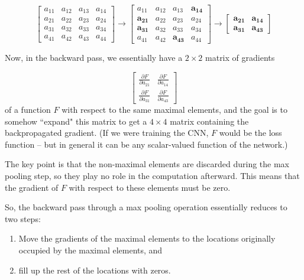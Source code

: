 \documentclass{article}[a4paper]
\begin{document}
\begin{equation*}
	\begin{bmatrix}
		a_{11} & a_{12} & a_{13} & a_{14} \\
		a_{21} & a_{22} & a_{23} & a_{24} \\
		a_{31} & a_{32} & a_{33} & a_{34} \\
		a_{41} & a_{42} & a_{43} & a_{44}
	\end{bmatrix} \rightarrow
	\begin{bmatrix}
		a_{11} & a_{12} & a_{13} & \mathbf{a_{14}} \\
		\mathbf{a_{21}} & a_{22} & a_{23} & a_{24} \\
		\mathbf{a_{31}} & a_{32} & a_{33} & a_{34} \\
		a_{41} & a_{42} & \mathbf{a_{43}} & a_{44}
	\end{bmatrix} \rightarrow
	\begin{bmatrix}
		\mathbf{a_{21}} & \mathbf{a_{14}} \\
		\mathbf{a_{31}} & \mathbf{a_{43}}
	\end{bmatrix}
\end{equation*}

Now, in the backward pass, we essentially have a $2 \times 2$ matrix of gradients

\begin{equation*}
	\renewcommand{\arraystretch}{1.5}
	\begin{bmatrix}
		\frac{\partial F}{\partial a_{21}} & \frac{\partial F}{\partial a_{14}} \\
		\frac{\partial F}{\partial a_{31}} & \frac{\partial F}{\partial a_{43}}
	\end{bmatrix}
\end{equation*}
of a function $F$ with respect to the same maximal elements, and the goal is to somehow ``expand" this matrix to get a $4 \times 4$ matrix containing the backpropagated gradient. (If we were training the CNN, $F$ would be the loss function -- but in general it can be any scalar-valued function of the network.)

The key point is that the non-maximal elements are discarded during the max pooling step, so they play no role in the computation afterward. This means that the gradient of $F$ with respect to these elements must be zero.

So, the backward pass through a max pooling operation essentially reduces to two steps:

\begin{enumerate}
	\item Move the gradients of the maximal elements to the locations originally occupied by the maximal elements, and
	\item fill up the rest of the locations with zeros.
\end{enumerate}
\end{document}
